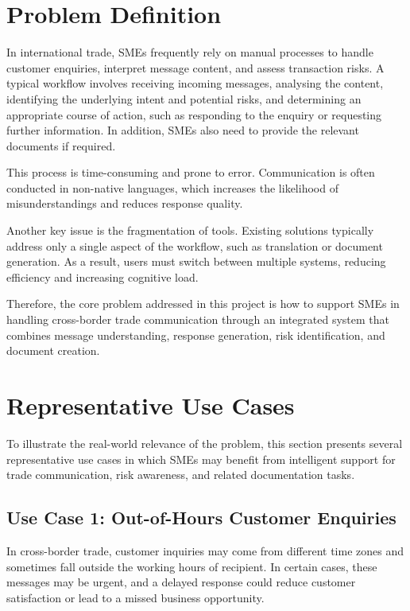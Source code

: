 \documentclass[12pt,a4paper]{report}
\begin{document}
\section{Problem Definition}

In international trade, SMEs frequently rely on manual processes to handle customer enquiries, interpret message content, and assess transaction risks. A typical workflow involves receiving incoming messages, analysing the content, identifying the underlying intent and potential risks, and determining an appropriate course of action, such as responding to the enquiry or requesting further information. In addition, SMEs also need to provide the relevant documents if required.

This process is time-consuming and prone to error. Communication is often conducted in non-native languages, which increases the likelihood of misunderstandings and reduces response quality.

Another key issue is the fragmentation of tools. Existing solutions typically address only a single aspect of the workflow, such as translation or document generation. As a result, users must switch between multiple systems, reducing efficiency and increasing cognitive load.

Therefore, the core problem addressed in this project is how to support SMEs in handling cross-border trade communication through an integrated system that combines message understanding, response generation, risk identification, and document creation.

\section{Representative Use Cases}

To illustrate the real-world relevance of the problem, this section presents several representative use cases in which SMEs may benefit from intelligent support for trade communication, risk awareness, and related documentation tasks.

\subsection*{Use Case 1: Out-of-Hours Customer Enquiries}

In cross-border trade, customer inquiries may come from different time zones and sometimes fall outside the working hours of recipient. In certain cases, these messages may be urgent, and a delayed response could reduce customer satisfaction or lead to a missed business opportunity.
\end{document}
